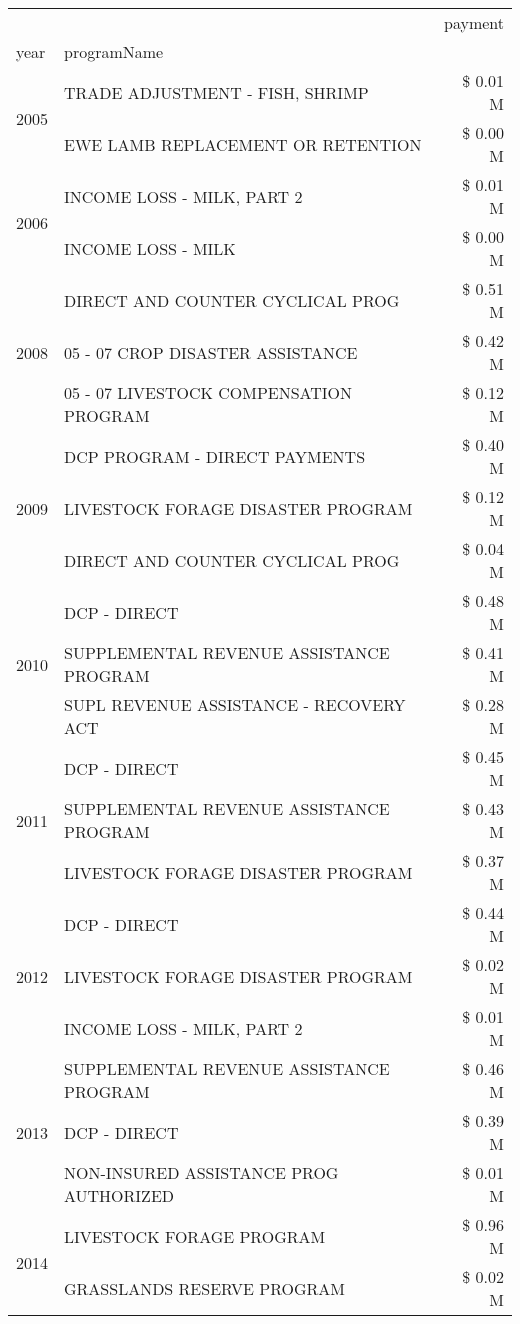 \begin{tabular}{llr}
\toprule
 &  & payment \\
year & programName &  \\
\midrule
\multirow[t]{2}{*}{2005} & TRADE ADJUSTMENT - FISH, SHRIMP & \$ 0.01 M \\
 & EWE LAMB REPLACEMENT OR RETENTION & \$ 0.00 M \\
\cline{1-3}
\multirow[t]{2}{*}{2006} & INCOME LOSS - MILK, PART 2 & \$ 0.01 M \\
 & INCOME LOSS - MILK & \$ 0.00 M \\
\cline{1-3}
\multirow[t]{3}{*}{2008} & DIRECT AND COUNTER CYCLICAL PROG & \$ 0.51 M \\
 & 05 - 07 CROP DISASTER ASSISTANCE & \$ 0.42 M \\
 & 05 - 07 LIVESTOCK COMPENSATION PROGRAM & \$ 0.12 M \\
\cline{1-3}
\multirow[t]{3}{*}{2009} & DCP PROGRAM - DIRECT PAYMENTS & \$ 0.40 M \\
 & LIVESTOCK FORAGE DISASTER  PROGRAM & \$ 0.12 M \\
 & DIRECT AND COUNTER CYCLICAL PROG & \$ 0.04 M \\
\cline{1-3}
\multirow[t]{3}{*}{2010} & DCP - DIRECT & \$ 0.48 M \\
 & SUPPLEMENTAL REVENUE ASSISTANCE PROGRAM & \$ 0.41 M \\
 & SUPL REVENUE ASSISTANCE - RECOVERY ACT & \$ 0.28 M \\
\cline{1-3}
\multirow[t]{3}{*}{2011} & DCP - DIRECT & \$ 0.45 M \\
 & SUPPLEMENTAL REVENUE ASSISTANCE PROGRAM & \$ 0.43 M \\
 & LIVESTOCK FORAGE DISASTER PROGRAM & \$ 0.37 M \\
\cline{1-3}
\multirow[t]{3}{*}{2012} & DCP - DIRECT & \$ 0.44 M \\
 & LIVESTOCK FORAGE DISASTER PROGRAM & \$ 0.02 M \\
 & INCOME LOSS - MILK, PART 2 & \$ 0.01 M \\
\cline{1-3}
\multirow[t]{3}{*}{2013} & SUPPLEMENTAL REVENUE ASSISTANCE PROGRAM & \$ 0.46 M \\
 & DCP - DIRECT & \$ 0.39 M \\
 & NON-INSURED ASSISTANCE PROG AUTHORIZED & \$ 0.01 M \\
\cline{1-3}
\multirow[t]{3}{*}{2014} & LIVESTOCK FORAGE PROGRAM & \$ 0.96 M \\
 & GRASSLANDS RESERVE PROGRAM & \$ 0.02 M \\

\end{tabular}
